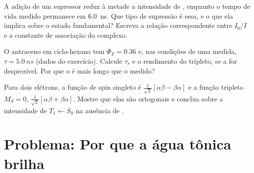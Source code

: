 \begin{exercise}[$\star\star\star$]\label{exo:b3:electronic-spectroscopy:10}
A adição de um supressor reduz à metade a intensidade de ,
enquanto o tempo de vida medido permanece em \qty{6.0}{ns}. Que tipo de supressão
é essa, e o que ela implica sobre o estado fundamental? Escreva a relação
correspondente entre $I_0/I$ e a constante de associação do complexo.
\end{exercise}

\begin{exercise}[$\star\star\star$]\label{exo:b3:electronic-spectroscopy:11}
O antraceno em ciclo-hexano tem $\Phi_F = 0.36$ e, nas condições de uma
medida, $\tau = \qty{5.0}{ns}$ (dados do exercício). Calcule $\tau_r$ e o
rendimento do tripleto, se a  for desprezível. Por que o
 é mais longo que o medido?
\end{exercise}

\begin{exercise}[$\star\star\star$]\label{exo:b3:electronic-spectroscopy:12}
Para dois elétrons, a função de spin singleto é $\frac{1}{\sqrt2}[\alpha\beta - \beta\alpha]$
e a função tripleto $M_S = 0$, $\frac{1}{\sqrt2}[\alpha\beta + \beta\alpha]$. Mostre que
elas são ortogonais e conclua sobre a intensidade de $T_1 \leftarrow S_0$ na
ausência de .
\end{exercise}

\section{Problema: Por que a água tônica brilha}

